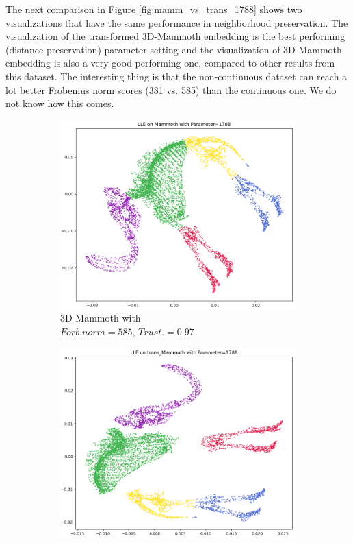 The next comparison in Figure \ref{fig:mamm_vs_trans_1788} shows two visualizations that have the same performance in neighborhood preservation. The visualization of the transformed 3D-Mammoth embedding is the best performing (distance preservation) parameter setting and the visualization of 3D-Mammoth embedding is also a very good performing one, compared to other results from this dataset. The interesting thing is that the non-continuous dataset can reach a lot better Frobenius norm scores (381 vs. 585) than the continuous one. We do not know how this comes.

\begin{figure}[!]
     \centering
     \begin{subfigure}[t]{0.49\columnwidth}
    	\centering
    	\includegraphics[width=\columnwidth]{images/LOW_Mammoth_lle_1788.png}
    	\caption{3D-Mammoth with \\ $Forb.norm=585$, $Trust.=0.97$}
        \label{fig:LOW_Mammoth_lle_1788}
    \end{subfigure}
     \hfill
     \begin{subfigure}[t]{0.49\columnwidth}
    	\centering
    	\includegraphics[width=\columnwidth]{images/LOW_trans_Mammoth_lle_1788.png}

\end{subfigure}
\end{figure}
